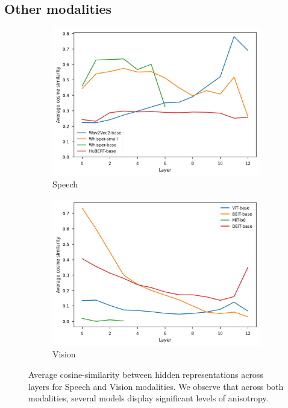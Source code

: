 \subsection{Other modalities}
\label{sec:other_mod}
\begin{figure}[ht]
    \centering
    \begin{subfigure}[b]{0.43\textwidth}
         \includegraphics[width=\linewidth]{sources/part_1/anisotropy/imgs/cosine_audio.png}
         \caption{Speech}
         \label{fig:cos_speech}
    \end{subfigure}
    \hfill
    \begin{subfigure}[b]{0.43\textwidth}
         \includegraphics[width=\linewidth]{sources/part_1/anisotropy/imgs/cosine_vit_imagenet.png}
         \caption{Vision}
         \label{fig:cos_audio}
    \end{subfigure}
    \caption{Average cosine-similarity between hidden representations across layers for Speech and Vision modalities. We observe that across both modalities, several models display significant levels of anisotropy.}
    \label{fig:anisotropy_modalities}
\end{figure}

